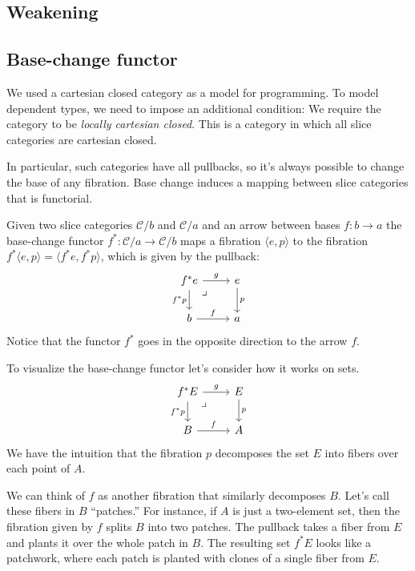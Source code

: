 \documentclass[DaoFP]{subfiles}
\begin{document}
\subsection{Weakening}

\subsection{Base-change functor}

We used a cartesian closed category as a model for programming. To model dependent types, we need to impose an additional condition: We require the category to be \emph{locally cartesian closed}. This is a category in which all slice categories are cartesian closed. 

In particular, such categories have all pullbacks, so it's always possible to change the base of any fibration.  Base change induces a mapping between slice categories that is functorial. 

Given two slice categories $\mathcal{C}/b$ and $\mathcal{C}/a$ and an arrow between bases $f \colon b \to a$ the base-change functor $f^* \colon \mathcal{C}/a \to \mathcal{C}/b$ maps a fibration $\langle e, p \rangle$ to the fibration $ f^* \langle e, p \rangle= \langle f^* e, f^* p \rangle$, which is given by the pullback:
\[
 \begin{tikzcd}
f^* e
\arrow[dr, phantom,  , very near start, "\lrcorner"]
 \arrow[d, "f^*p"']
 \arrow[r, "g"]
 & e
 \arrow[d, "p"]
 \\
 b
 \arrow[r, "f"]
 &a
  \end{tikzcd}
\]
Notice that the functor $f^*$ goes in the opposite direction to the arrow $f$.

To visualize the base-change functor let's consider how it works on sets. 
\[
 \begin{tikzcd}
f^* E
\arrow[dr, phantom,  , very near start, "\lrcorner"]
 \arrow[d, "f^*p"']
 \arrow[r, "g"]
 & E
 \arrow[d, "p"]
 \\
 B
 \arrow[r, "f"]
 &A
  \end{tikzcd}
\]
We have the intuition that the fibration $p$ decomposes the set $E$ into fibers over each point of $A$. 

We can think of $f$ as another fibration that similarly decomposes $B$. Let's call these fibers in $B$ ``patches.'' For instance, if $A$ is just a two-element set, then the fibration given by $f$ splits $B$ into two patches. The pullback takes a fiber from $E$ and plants it over the whole patch in $B$. The resulting set $f^*E$ looks like a patchwork, where each patch is planted with clones of a single fiber from $E$.
\end{document}
